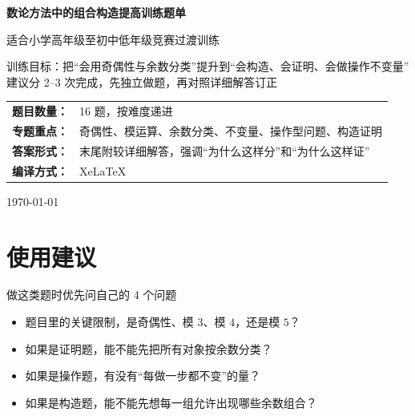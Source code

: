 \documentclass[11pt,a4paper,fontset=fandol]{ctexart}
\theoremstyle{formalexample}
\begin{document}
\thispagestyle{empty}
\begin{titlepage}
\centering
\vspace*{0.9cm}
\begin{tcolorbox}[
  enhanced,
  width=0.92\textwidth,
  colback=white,
  colframe=mainblue,
  boxrule=1pt,
  arc=0mm,
  left=6mm,
  right=6mm,
  top=8mm,
  bottom=8mm
]
\centering
{\fontsize{24}{30}\selectfont\bfseries 数论方法中的组合构造提高训练题单\par}
\vspace{0.6cm}
{\fontsize{17}{22}\selectfont 适合小学高年级至初中低年级竞赛过渡训练\par}

\vspace{1cm}
\begin{tcolorbox}[colback=lightblue,colframe=mainblue,width=0.84\textwidth,boxrule=1pt]
\centering
{\large 训练目标：把“会用奇偶性与余数分类”提升到“会构造、会证明、会做操作不变量”}\\[0.35em]
{\normalsize 建议分 2--3 次完成，先独立做题，再对照详细解答订正}
\end{tcolorbox}

\vspace{1cm}
\renewcommand{\arraystretch}{1.42}
\begin{tabular}{>{\bfseries}p{3.5cm}p{8cm}}
题目数量： & 16 题，按难度递进 \\
专题重点： & 奇偶性、模运算、余数分类、不变量、操作型问题、构造证明 \\
答案形式： & 末尾附较详细解答，强调“为什么这样分”和“为什么这样证” \\
编译方式： & XeLaTeX \\
\end{tabular}

\vspace{0.9cm}
{\large \today\par}
\end{tcolorbox}
\end{titlepage}

\tableofcontents
\newpage

\section{使用建议}

\begin{goalbox}{做这类题时优先问自己的 4 个问题}
\begin{itemize}
  \item 题目里的关键限制，是奇偶性、模 $3$、模 $4$，还是模 $5$？
  \item 如果是证明题，能不能先把所有对象按余数分类？
  \item 如果是操作题，有没有“每做一步都不变”的量？
  \item 如果是构造题，能不能先想每一组允许出现哪些余数组合？
\end{itemize}
\end{goalbox}
\end{document}
